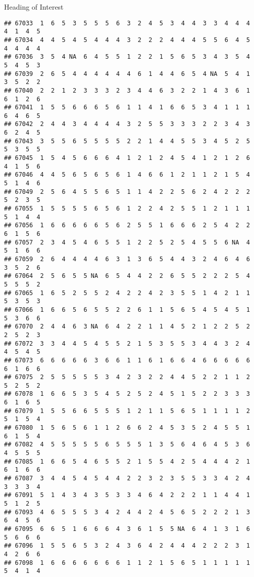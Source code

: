 \documentclass[
  ignorenonframetext,
]{beamer}
\begin{document}
\begin{frame}[fragile]{Heading of Interest}
\begin{verbatim}
## 67033  1  6  5  3  5  5  5  6  3  2  4  5  3  4  4  3  3  4  4  4  4  1  4  5
## 67034  4  4  5  4  5  4  4  4  3  2  2  2  4  4  4  5  5  6  4  5  4  4  4  4
## 67036  3  5  4 NA  6  4  5  5  1  2  2  1  5  6  5  3  4  3  5  4  5  4  5  3
## 67039  2  6  5  4  4  4  4  4  4  6  1  4  4  6  5  4 NA  5  4  1  3  5  2  2
## 67040  2  2  1  2  3  3  3  2  3  4  4  6  3  2  2  1  4  3  6  1  6  1  2  6
## 67041  1  5  5  6  6  6  5  6  1  1  4  1  6  6  5  3  4  1  1  1  6  4  6  5
## 67042  2  4  4  3  4  4  4  4  3  2  5  5  3  3  3  2  2  3  4  3  6  2  4  5
## 67043  3  5  5  6  5  5  5  5  2  2  1  4  4  5  5  3  4  5  2  5  5  3  5  5
## 67045  1  5  4  5  6  6  6  4  1  2  1  2  4  5  4  1  2  1  2  6  4  1  5  6
## 67046  4  4  5  6  5  6  5  6  1  4  6  6  1  2  1  1  2  1  5  4  5  1  4  6
## 67049  2  5  6  4  5  5  6  5  1  1  4  2  2  5  6  2  4  2  2  2  5  2  3  5
## 67055  1  5  5  5  5  6  5  6  1  2  2  4  2  5  5  1  2  1  1  1  5  1  4  4
## 67056  1  6  6  6  6  6  5  6  2  5  5  1  6  6  6  2  5  4  2  2  6  1  5  6
## 67057  2  3  4  5  4  6  5  5  1  2  2  5  2  5  4  5  5  6 NA  4  5  1  6  6
## 67059  2  6  4  4  4  4  6  3  1  3  6  5  4  4  3  2  4  6  4  6  3  5  2  6
## 67064  2  5  6  5  5 NA  6  5  4  4  2  2  6  5  5  2  2  2  5  4  5  5  5  2
## 67065  1  6  5  2  5  5  2  4  2  2  4  2  3  5  5  1  4  2  1  1  5  3  5  3
## 67066  1  6  6  5  6  5  5  2  2  6  1  1  5  6  5  4  5  4  5  1  5  3  6  6
## 67070  2  4  4  6  3 NA  6  4  2  2  1  1  4  5  2  1  2  2  5  2  2  5  2  3
## 67072  3  3  4  4  5  4  5  5  2  1  5  3  5  5  3  4  4  3  2  4  4  5  4  5
## 67073  6  6  6  6  6  3  6  6  1  1  6  1  6  6  4  6  6  6  6  6  6  1  6  6
## 67075  2  5  5  5  5  5  3  4  2  3  2  2  4  4  5  2  2  1  1  2  5  2  5  2
## 67078  1  6  6  5  3  5  4  5  2  5  2  4  5  1  5  2  2  3  3  3  6  1  6  5
## 67079  1  5  5  6  6  5  5  5  1  2  1  1  5  6  5  1  1  1  1  2  5  1  5  4
## 67080  1  5  6  5  6  1  1  2  6  6  2  4  5  3  5  2  4  5  5  1  6  1  5  4
## 67082  4  5  5  5  5  5  6  5  5  5  1  3  5  6  4  6  4  5  3  6  4  5  5  5
## 67085  1  6  6  5  4  6  5  5  2  1  5  5  4  2  5  4  4  4  2  1  6  1  6  6
## 67087  3  4  4  5  4  5  4  4  2  2  3  2  3  5  5  3  3  4  2  4  3  3  3  4
## 67091  5  1  4  3  4  3  5  3  3  4  6  4  2  2  2  1  1  4  4  1  5  1  2  5
## 67093  4  6  5  5  5  3  4  2  4  4  2  4  5  6  5  2  2  2  1  3  6  4  5  6
## 67095  6  6  5  1  6  6  6  4  3  6  1  5  5 NA  6  4  1  3  1  6  5  6  6  6
## 67096  1  5  5  6  5  3  2  4  3  6  4  2  4  4  4  2  2  2  3  1  4  2  6  6
## 67098  1  6  6  6  6  6  6  6  1  1  2  1  5  6  5  1  1  1  1  1  5  4  1  4

\end{verbatim}
\end{frame}
\end{document}
